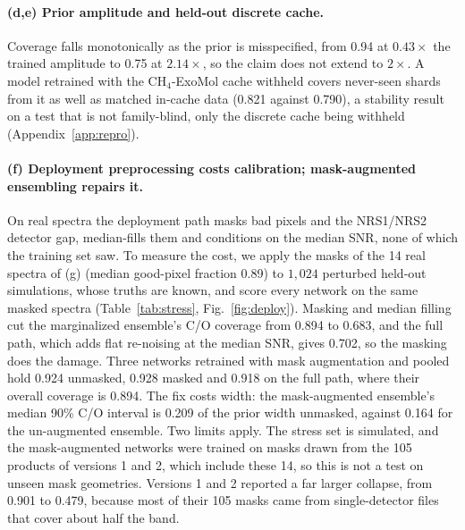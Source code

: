 \documentclass{article}
\begin{document}
\paragraph{(d,e) Prior amplitude and held-out discrete cache.}
Coverage falls monotonically as the prior is misspecified, from 0.94 at
$0.43\times$ the trained amplitude to 0.75 at $2.14\times$, so the claim does
not extend to $2\times$. A model retrained with the CH$_4$-ExoMol cache withheld
covers never-seen shards from it as well as matched in-cache data (0.821 against 0.790), a stability result on a test that is not family-blind,
only the discrete cache being withheld (Appendix~\ref{app:repro}).

\paragraph{(f) Deployment preprocessing costs calibration; mask-augmented
ensembling repairs it.}
On real spectra the deployment path masks bad pixels and the NRS1/NRS2 detector
gap, median-fills them and conditions on the median SNR, none of which the
training set saw. To measure the cost, we apply the masks of the 14 real spectra
of (g) (median good-pixel fraction 0.89) to $1{,}024$ perturbed held-out
simulations, whose truths are known, and score every network on the same masked
spectra (Table~\ref{tab:stress}, Fig.~\ref{fig:deploy}). Masking and median
filling cut the marginalized ensemble's C/O coverage from 0.894 to 0.683, and
the full path, which adds flat re-noising at the median SNR, gives 0.702, so the
masking does the damage. Three networks retrained with mask augmentation and
pooled hold 0.924 unmasked, 0.928 masked and 0.918 on the full path, where
their overall coverage is 0.894. The fix costs width: the mask-augmented
ensemble's median 90\% C/O interval is 0.209 of the prior width unmasked, against
0.164 for the un-augmented ensemble. Two limits apply. The stress set is
simulated, and the mask-augmented networks were trained on masks drawn from the
105 products of versions 1 and 2, which include these 14, so this is not a test
on unseen mask geometries. Versions 1 and 2
reported a far larger collapse, from 0.901 to 0.479, because most of their 105
masks came from single-detector files that cover about half the band.
\end{document}
